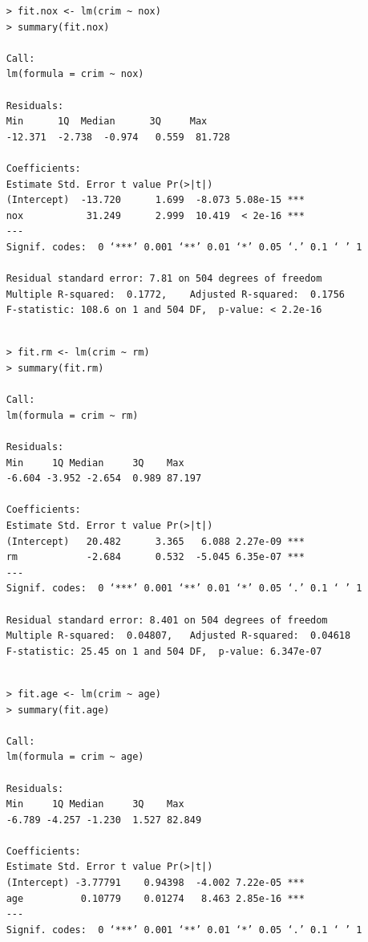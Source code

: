 \documentclass{article}
\begin{document}
\begin{itemize}
\begin{program}
	\begin{verbatim}
	> fit.nox <- lm(crim ~ nox)
	> summary(fit.nox)
	
	Call:
	lm(formula = crim ~ nox)
	
	Residuals:
	Min      1Q  Median      3Q     Max 
	-12.371  -2.738  -0.974   0.559  81.728 
	
	Coefficients:
	Estimate Std. Error t value Pr(>|t|)    
	(Intercept)  -13.720      1.699  -8.073 5.08e-15 ***
	nox           31.249      2.999  10.419  < 2e-16 ***
	---
	Signif. codes:  0 ‘***’ 0.001 ‘**’ 0.01 ‘*’ 0.05 ‘.’ 0.1 ‘ ’ 1
	
	Residual standard error: 7.81 on 504 degrees of freedom
	Multiple R-squared:  0.1772,	Adjusted R-squared:  0.1756 
	F-statistic: 108.6 on 1 and 504 DF,  p-value: < 2.2e-16
	
	\end{verbatim}
\end{program}

\begin{program}
	\begin{verbatim}
	> fit.rm <- lm(crim ~ rm)
	> summary(fit.rm)
	
	Call:
	lm(formula = crim ~ rm)
	
	Residuals:
	Min     1Q Median     3Q    Max 
	-6.604 -3.952 -2.654  0.989 87.197 
	
	Coefficients:
	Estimate Std. Error t value Pr(>|t|)    
	(Intercept)   20.482      3.365   6.088 2.27e-09 ***
	rm            -2.684      0.532  -5.045 6.35e-07 ***
	---
	Signif. codes:  0 ‘***’ 0.001 ‘**’ 0.01 ‘*’ 0.05 ‘.’ 0.1 ‘ ’ 1
	
	Residual standard error: 8.401 on 504 degrees of freedom
	Multiple R-squared:  0.04807,	Adjusted R-squared:  0.04618 
	F-statistic: 25.45 on 1 and 504 DF,  p-value: 6.347e-07
	
	\end{verbatim}
\end{program}

\begin{program}
	\begin{verbatim}
	> fit.age <- lm(crim ~ age)
	> summary(fit.age)
	
	Call:
	lm(formula = crim ~ age)
	
	Residuals:
	Min     1Q Median     3Q    Max 
	-6.789 -4.257 -1.230  1.527 82.849 
	
	Coefficients:
	Estimate Std. Error t value Pr(>|t|)    
	(Intercept) -3.77791    0.94398  -4.002 7.22e-05 ***
	age          0.10779    0.01274   8.463 2.85e-16 ***
	---
	Signif. codes:  0 ‘***’ 0.001 ‘**’ 0.01 ‘*’ 0.05 ‘.’ 0.1 ‘ ’ 1
	

\end{verbatim}
\end{program}
\end{itemize}
\end{document}
